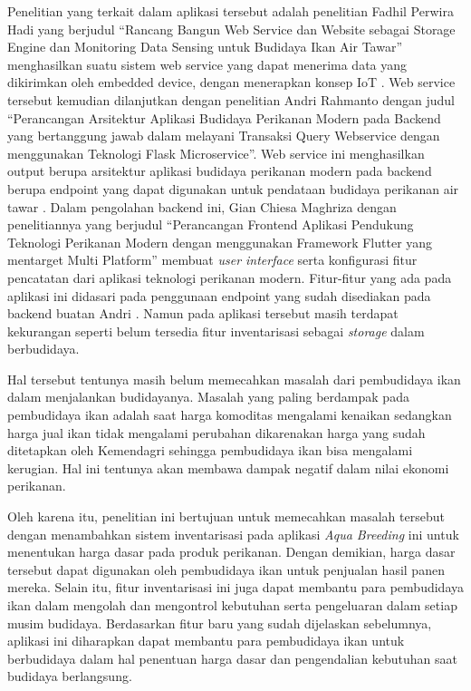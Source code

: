 Penelitian yang terkait dalam aplikasi tersebut adalah penelitian Fadhil Perwira Hadi yang berjudul “Rancang Bangun Web Service dan Website sebagai Storage Engine dan Monitoring Data Sensing untuk Budidaya Ikan Air Tawar” menghasilkan suatu sistem web service yang dapat menerima data yang dikirimkan oleh embedded device, dengan menerapkan konsep IoT \citep{fadhil2021}. Web service tersebut kemudian dilanjutkan dengan penelitian Andri Rahmanto dengan judul “Perancangan Arsitektur Aplikasi Budidaya Perikanan Modern pada Backend yang bertanggung jawab dalam melayani Transaksi Query Webservice dengan menggunakan Teknologi Flask Microservice”. Web service ini menghasilkan output berupa arsitektur aplikasi budidaya perikanan modern pada backend berupa endpoint yang dapat digunakan untuk pendataan budidaya perikanan air tawar \citep{andri2022}. Dalam pengolahan backend ini, Gian Chiesa Maghriza dengan penelitiannya yang berjudul “Perancangan Frontend Aplikasi Pendukung Teknologi Perikanan Modern dengan menggunakan Framework Flutter yang mentarget Multi Platform” membuat \textit{user interface} serta konfigurasi fitur pencatatan dari aplikasi teknologi perikanan modern. Fitur-fitur yang ada pada aplikasi ini didasari pada penggunaan endpoint yang sudah disediakan pada backend buatan Andri \citep{gian2022}. Namun pada aplikasi tersebut masih terdapat kekurangan seperti belum tersedia fitur inventarisasi sebagai \textit{storage} dalam berbudidaya.

Hal tersebut tentunya masih belum memecahkan masalah dari pembudidaya ikan dalam menjalankan budidayanya. Masalah yang paling berdampak pada pembudidaya ikan adalah saat harga komoditas mengalami kenaikan sedangkan harga jual ikan tidak mengalami perubahan dikarenakan harga yang sudah ditetapkan oleh Kemendagri sehingga pembudidaya ikan bisa mengalami kerugian. Hal ini tentunya akan membawa dampak negatif dalam nilai ekonomi perikanan.

Oleh karena itu, penelitian ini bertujuan untuk memecahkan masalah tersebut dengan menambahkan sistem inventarisasi pada aplikasi \textit{Aqua Breeding} ini untuk menentukan harga dasar pada produk perikanan. Dengan demikian, harga dasar tersebut dapat digunakan oleh pembudidaya ikan untuk penjualan hasil panen mereka. Selain itu, fitur inventarisasi ini juga dapat membantu para pembudidaya ikan dalam mengolah dan mengontrol kebutuhan serta pengeluaran dalam setiap musim budidaya. Berdasarkan fitur baru yang sudah dijelaskan sebelumnya, aplikasi ini diharapkan dapat membantu para pembudidaya ikan untuk berbudidaya dalam hal penentuan harga dasar dan pengendalian kebutuhan saat budidaya berlangsung. 

